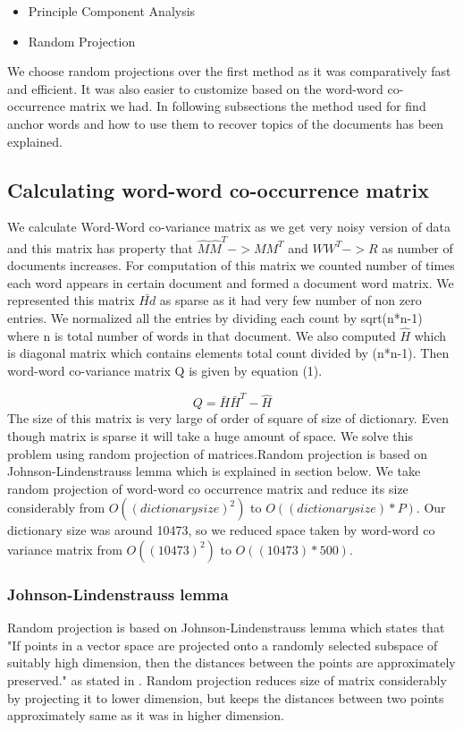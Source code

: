 \documentclass[a4paper,11pt]{article}
\begin{document}
\begin{itemize}
\item Principle Component Analysis
\item Random Projection 
\end{itemize} 

We choose random projections over the first method as it was comparatively fast and efficient. It was also easier to customize based on the word-word co-occurrence matrix we had. In following subsections the method used for find anchor words and how to use them to recover topics of the documents has been explained. \\

\subsection{Calculating word-word co-occurrence matrix}
We calculate Word-Word co-variance matrix as we get very noisy version of data and this matrix has property that  $\hat{M} \hat{M}^T -> M M^T $ and $W W^T -> R$ as number of documents increases. For computation of this matrix we counted number of times each word appears in certain document and formed a document word matrix. We represented this matrix $\bar{Hd}$ as sparse as it had very few number of non zero entries. We normalized all the entries by dividing each count by sqrt(n*n-1) where n is total number of words in that document. We also computed $\hat{H}$ which is diagonal matrix which contains elements total count divided by (n*n-1). Then word-word co-variance matrix Q is given by equation (1).

\begin{equation}
Q = \bar{H} \bar{H}^T - \hat{H}
\end{equation}
The size of this matrix is very large of order of square of size of dictionary. Even though matrix is sparse it will take a huge amount of space. We solve this problem using random projection of matrices.Random projection is based on Johnson-Lindenstrauss lemma which is explained in section below. We take random projection of word-word co occurrence matrix and reduce its size considerably from $O((dictionary size)^2)$ to $O((dictionary size)*P)$. Our dictionary size was around 10473, so we reduced space taken by word-word co variance matrix from $O((10473)^2)$ to $O((10473)*500)$.

\subsubsection{Johnson-Lindenstrauss lemma}
Random projection is based on Johnson-Lindenstrauss lemma which states that "If points in a vector space are projected onto a randomly selected subspace of suitably high dimension, then the distances between the points are approximately preserved." as stated in \cite{randomProjection}. Random projection reduces size of matrix considerably by projecting it to lower dimension, but keeps the distances between two points approximately same as it was in higher dimension.
\end{document}
